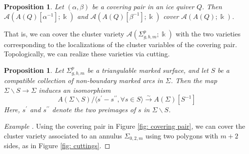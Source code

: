\documentclass[reqno,12pt]{amsart}
\newtheorem{prop}[thm]{Proposition}
\theoremstyle{definition}
\theoremstyle{remark}
\theoremstyle{remark}
\newenvironment{ex}{\refstepcounter{thm}\begin{proof}[Example \emph{\thethm}]\renewcommand*{\qedsymbol}{\(\blacksquare\)}}{\end{proof}}
\numberwithin{equation}{section}
\begin{document}
\begin{prop}\cite[Corollary 5.4]{Mul13}
    Let $(\alpha,\beta)$ be a covering pair in an ice quiver $Q$. Then $\mathcal{A}(A(Q)[\alpha^{-1}]; \Bbbk)$ and $\mathcal{A}(A(Q)[\beta^{-1}]; \Bbbk)$ cover $\mathcal{A}(A(Q); \Bbbk)$.
\end{prop}

That is, we can cover the cluster variety $\mathcal{A}(\Sigma_{g,b,m}^p; \Bbbk)$ with the two varieties corresponding to the localizations of the cluster variables of the covering pair. Topologically, we can realize these varieties via cutting.

\begin{prop}\cite[Proposition 5.3.9]{BeyerDissertation}
    Let $\Sigma_{g,b,m}^p$ be a triangulable marked surface, and let $S$ be a compatible collection of non-boundary marked arcs in $\Sigma$. Then the map $\Sigma \smallsetminus S \to \Sigma$ induces an isomorphism 
    \[ A(\Sigma \smallsetminus S)/\langle s^\prime - s^{\prime \prime}, \forall s \in S \rangle \overset{\sim}{\longrightarrow} A(\Sigma)[S^{-1} ] \]
    Here, $s^\prime$ and $s^{\prime \prime}$ denote the two preimages of $s$ in $\Sigma \smallsetminus S$.
\end{prop}

\begin{ex}\label{ex: annulus cutting}
Using the covering pair in Figure \ref{fig: covering pair}, we can cover the cluster variety associated to an annulus $\Sigma_{0,2,m}$ using two polygons with $m+2$ sides, as in Figure \ref{fig: cuttings}.
\end{ex}
\end{document}
